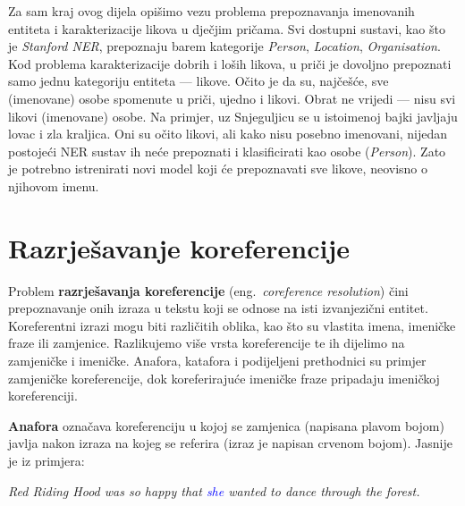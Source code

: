\documentclass[a4paper,twoside,12pt]{memoir} %
\newcommand{\ti}[1]{\textit{#1\/}}
\newcommand{\tb}{\textbf}
\begin{document}
	\bigskip

	Za sam kraj ovog dijela opišimo vezu problema prepoznavanja imenovanih entiteta i karakterizacije likova u dječjim pričama.
	Svi dostupni sustavi, kao što je \ti{Stanford NER}, prepoznaju barem kategorije \ti{Person}, \ti{Location}, \ti{Organisation}. Kod problema karakterizacije dobrih i loših likova, u priči je dovoljno prepoznati samo jednu kategoriju entiteta --- likove. Očito je da su, najčešće, sve (imenovane) osobe spomenute u priči, ujedno i likovi. Obrat ne vrijedi --- nisu svi likovi (imenovane) osobe. Na primjer, uz Snjeguljicu se u istoimenoj bajki javljaju lovac i zla kraljica. Oni su očito likovi, ali kako nisu posebno imenovani, nijedan postojeći NER sustav ih neće prepoznati i klasificirati kao osobe (\ti{Person}). Zato je potrebno istrenirati novi model koji će prepoznavati sve likove, neovisno o njihovom imenu.


	\section{Razrješavanje koreferencije}

	Problem \tb{razrješavanja koreferencije}  (eng.~\ti{coreference resolution}) čini prepoznavanje onih izraza u tekstu koji se odnose na isti izvanjezični entitet. Koreferentni izrazi mogu biti različitih oblika, kao što su vlastita imena, imeničke fraze ili zamjenice. Razlikujemo više vrsta koreferencije te ih dijelimo na zamjeničke i imeničke. Anafora, katafora i podijeljeni prethodnici su primjer zamjeničke koreferencije, dok koreferirajuće imeničke fraze pripadaju imeničkoj koreferenciji.


	\tb{Anafora} označava koreferenciju u kojoj se zamjenica (napisana plavom bojom) javlja nakon izraza na kojeg se referira (izraz je napisan crvenom bojom). Jasnije je iz primjera:
	\begin{displayquote}
		\ti{\textcolor{BrickRed}{Red Riding Hood} was so happy that \textcolor{Blue}{she} wanted to dance through the forest.}
	\end{displayquote}
\end{document}
